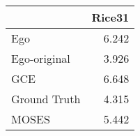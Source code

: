 \begin{tabular}{lr}
\toprule
{} & Rice31 \\
\midrule
Ego          &  6.242 \\
Ego-original &  3.926 \\
GCE          &  6.648 \\
Ground Truth &  4.315 \\
MOSES        &  5.442 \\
\bottomrule
\end{tabular}
